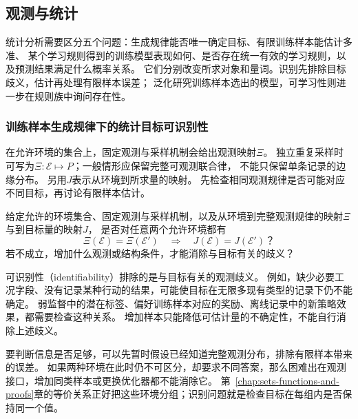 \subsection{观测与统计}
\label{sec:future-data-law-object-map}
\label{sec:future-information-proxy-map}
\label{sec:future-generalization-learnability-map}
\label{sec:future-reliability-map}
\label{sec:future-fairness-alignment-interpretation-map}

统计分析需要区分五个问题：生成规律能否唯一确定目标、有限训练样本能估计多准、
某个学习规则得到的训练模型表现如何、是否存在统一有效的学习规则，以及预测结果满足什么概率关系。
它们分别改变所求对象和量词。识别先排除目标歧义，估计再处理有限样本误差；
泛化研究训练样本选出的模型，可学习性则进一步在规则族中询问存在性。

\subsubsection{训练样本生成规律下的统计目标可识别性}
\label{sec:future-analysis-identification}

在允许环境的集合上，固定观测与采样机制会给出观测映射$\Xi$。
独立重复采样时可写为$\Xi:\mathcal E\mapsto P$；一般情形应保留完整可观测联合律，
不能只保留单条记录的边缘分布。
另用$J$表示从环境到所求量的映射。
先检查相同观测规律是否可能对应不同目标，再讨论有限样本估计。

\begin{mathproblem}[可观测规律是否确定所求量]
  \label{question:future-identification}
  给定允许的环境集合、固定观测与采样机制，以及从环境到完整观测规律的映射$\Xi$
  与到目标量的映射$J$，
  是否对任意两个允许环境都有
  \[
    \Xi(\mathcal E)=\Xi(\mathcal E')
    \quad\Longrightarrow\quad
    J(\mathcal E)=J(\mathcal E')\text{？}
  \]
  若不成立，增加什么观测或结构条件，才能消除与目标有关的歧义？
\end{mathproblem}

可识别性（identifiability）排除的是与目标有关的观测歧义。
例如，缺少必要工况字段、没有记录某种行动的结果，可能使目标在无限多现有类型的记录下仍不能确定。
弱监督中的潜在标签、偏好训练样本对应的奖励、离线记录中的新策略效果，都需要检查这种关系。
增加样本只能降低可估计量的不确定性，不能自行消除上述歧义。

要判断信息是否足够，可以先暂时假设已经知道完整观测分布，排除有限样本带来的误差。
如果两种环境在此时仍不可区分，却要求不同答案，那么困难出在观测接口，增加同类样本或更换优化器都不能消除它。
第~\ref{chap:sets-functions-and-proofs}章的等价关系正好把这些环境分组；识别问题就是检查目标在每组内是否保持同一个值。

